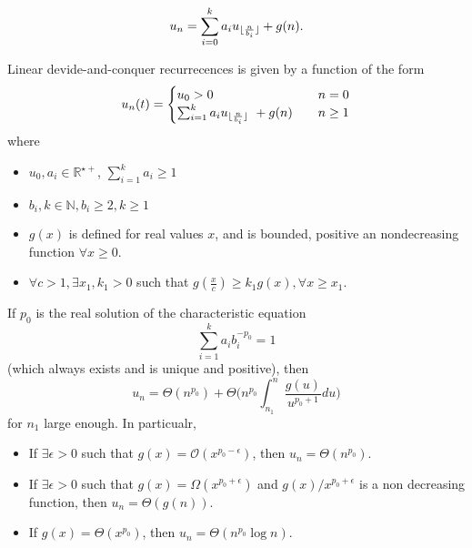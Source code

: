  \begin{equation}
 \label{eq:linearDevideAndConquerRecurrence}
 u_n = \sum_{i=0}^k a_i u _{\lfloor\frac{n}{b_i}\rfloor} + g(n).
 \end{equation}
 
 Linear devide-and-conquer recurrecences is given by a function of the form\begin{equation}
 u_n(t) = 
 	\begin{cases}
			u_0 > 0 & n= 0 \\
			\sum_{i=1}^k a_i u_{\lfloor\frac{n}{b_i}\rfloor} \ + g(n) \quad &n  \geq 1 
	\end{cases}
 \end{equation}
 where
 \begin{itemize}
 \item $u_0, a_i \in \mathbb{R}^{\star+}$, $\sum_{i=1}^k a_i \geq 1$
 \item $b_{i}, k \in \mathbb{N}, b_i \geq 2, k\geq 1$
 \item $g(x)$ is defined for real values $x$, and is bounded, positive an nondecreasing function $\forall x\geq 0$.
 \item $\forall c > 1, \exists x_1, k_1 >0$ such that $g(\frac{x}{c}) \geq k_1 g(x), \forall x \geq x_1$. 
 \end{itemize}
 
 \begin{theorem}
 \label{thm:AkraAndBazzi}
 If $p_0$ is the real solution of the characteristic equation
 \begin{equation}
 \label{eq:characteristicequation}
 \sum_{i=1}^k a_i b_i ^{-p_0} = 1
 \end{equation}
 (which always exists and is unique and positive), then 
 \begin{equation}
 u_n = \Theta(n^{p_0}) + \Theta \Big( n^{p_0} \int_{n_1}^n \frac{g(u)}{u^{p_0+1}}  du \Big)
 \end{equation}
 for $n_1$ large enough. In particualr,
 \begin{itemize}
 \item If $\exists \epsilon >0$ such that $g(x)=\mathcal{O}(x^{p_0-\epsilon})$, then $u_n = \Theta (n^{p_0})$.
 \item If $\exists \epsilon > 0$ such that $g(x) = \Omega(x^{p_0 + \epsilon})$ and $g(x)/ x^{p_0+\epsilon}$ is a non decreasing function, then $u_n = \Theta(g(n))$.
 \item If $g(x) = \Theta(x^{p_0})$, then $u_{n} = \Theta(n^{p_0} \log n)$. 
 \end{itemize}
 \end{theorem}
 
